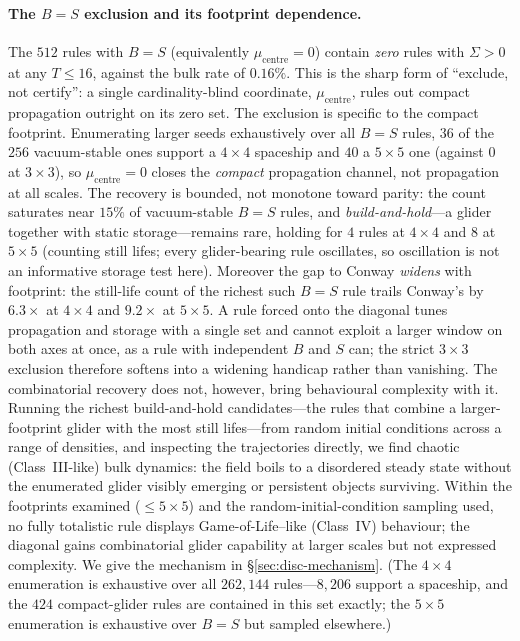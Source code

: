 \documentclass{article}
\begin{document}
\paragraph{The $B=S$ exclusion and its footprint dependence.}
The $512$ rules with $B=S$ (equivalently $\mu_{\text{centre}}=0$) contain
\emph{zero} rules with $\Sigma>0$ at any $T\le16$, against the bulk rate of
$0.16\%$. This is the sharp form of ``exclude, not certify'': a single
cardinality-blind coordinate, $\mu_{\text{centre}}$, rules out compact
propagation outright on its zero set. The exclusion is specific to the compact
footprint. Enumerating larger seeds exhaustively over all $B=S$ rules, $36$ of
the $256$ vacuum-stable ones support a $4{\times}4$ spaceship and $40$ a
$5{\times}5$ one (against $0$ at $3{\times}3$), so $\mu_{\text{centre}}=0$ closes
the \emph{compact} propagation channel, not propagation at all scales. The
recovery is bounded, not monotone toward parity: the count saturates near $15\%$
of vacuum-stable $B=S$ rules, and \emph{build-and-hold}---a glider together with
static storage---remains rare, holding for $4$ rules at $4{\times}4$ and $8$ at
$5{\times}5$ (counting still lifes; every glider-bearing rule oscillates, so
oscillation is not an informative storage test here). Moreover the gap to Conway
\emph{widens} with footprint: the still-life count of the richest such $B=S$ rule
trails Conway's by $6.3\times$ at $4{\times}4$ and $9.2\times$ at $5{\times}5$. A
rule forced onto the diagonal tunes propagation and storage with a single set and
cannot exploit a larger window on both axes at once, as a rule with independent
$B$ and $S$ can; the strict $3{\times}3$ exclusion therefore softens into a
widening handicap rather than vanishing. The combinatorial recovery does not,
however, bring behavioural complexity with it. Running the richest build-and-hold
candidates---the rules that combine a larger-footprint glider with the most still
lifes---from random initial conditions across a range of densities, and inspecting
the trajectories directly, we find chaotic (Class~III-like) bulk dynamics: the
field boils to a disordered steady state without the enumerated glider visibly
emerging or persistent objects surviving. Within the footprints examined
($\le5{\times}5$) and the random-initial-condition sampling used, no fully
totalistic rule displays Game-of-Life--like (Class~IV) behaviour; the diagonal
gains combinatorial glider capability at larger scales but not expressed
complexity. We give the mechanism in
\S\ref{sec:disc-mechanism}. (The $4{\times}4$ enumeration is exhaustive over all
$262{,}144$ rules---$8{,}206$ support a spaceship, and the $424$ compact-glider
rules are contained in this set exactly; the $5{\times}5$ enumeration is
exhaustive over $B=S$ but sampled elsewhere.)
\end{document}
